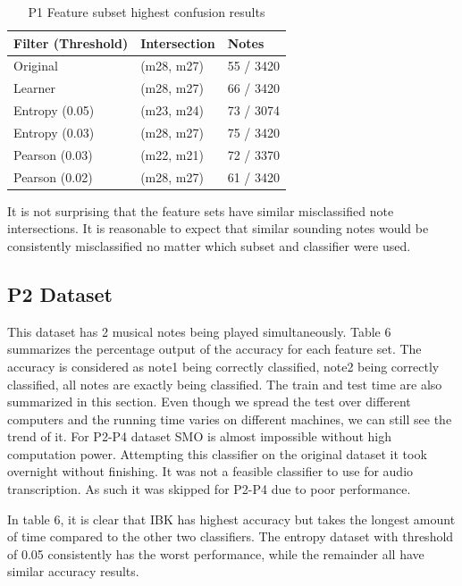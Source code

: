 \documentclass{article}
\begin{document}
\begin{table}[h]
 \begin{center}
  \caption{P1 Feature subset highest confusion results}
\begin{tabular}{|C{2cm}|C{2cm}|C{2cm}|}
      \hline
          Filter (Threshold)& Intersection& Notes \\
         \hline
         Original & (m28, m27)  & 55 / 3420\\
         \hline
         Learner  & (m28, m27)  & 66 / 3420\\
          \hline
         Entropy (0.05) & (m23, m24) &73 / 3074\\
         \hline
         Entropy (0.03)  & (m28, m27)  & 75 / 3420\\
         \hline
         Pearson (0.03) & (m22, m21) & 72 / 3370\\
         \hline
         Pearson (0.02)  & (m28, m27)  & 61 / 3420\\
       \hline
\end{tabular}
\end{center}
 \label{table4}
\end{table}
It is not surprising that the feature sets have similar misclassified note intersections. It is reasonable to expect that similar sounding notes would be consistently misclassified no matter which subset and classifier were used. 


\subsection{P2 Dataset}
This dataset has 2 musical notes being played simultaneously. Table 6 summarizes the percentage output of the accuracy for each feature set. The accuracy is considered as note1 being correctly classified, note2 being correctly classified, all notes are exactly being classified. The train and test time are also summarized in this section. Even though we spread the test over different computers and the running time varies on different machines, we can still see the trend of it.  For P2-P4 dataset SMO is almost impossible without high computation power. Attempting this classifier on the original dataset it took overnight without finishing. It was not a feasible classifier to use for audio transcription. As such it was skipped for P2-P4 due to poor performance. 

In table 6, it is clear that IBK has highest accuracy but takes the longest amount of time compared to the other two classifiers. The entropy dataset with threshold of 0.05 consistently has the worst performance, while the remainder all have similar accuracy results. 
\end{document}
